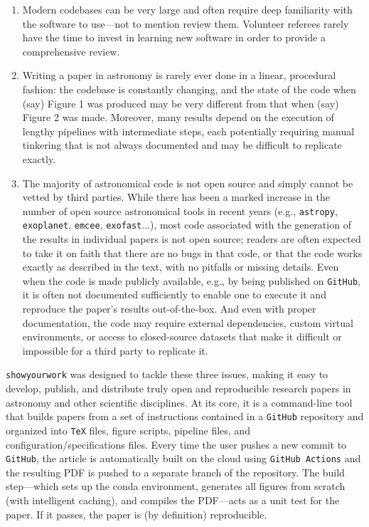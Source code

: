 \documentclass[modern]{aastex631}
\newcommand\syw{\texttt{showyourwork}\xspace}
\begin{document}
\begin{enumerate}
    \item Modern codebases can be very large and often require deep familiarity with the software to use---not to mention review them. Volunteer referees rarely have the time to invest in learning new software in order to provide a comprehensive review.
    \item  Writing a paper in astronomy is rarely ever done in a linear, procedural fashion: the codebase is constantly changing, and the state of the code when (say) Figure 1 was produced may be very different from that when (say) Figure 2 was made. 
    Moreover, many results depend on the execution of lengthy pipelines with intermediate steps, each potentially requiring manual tinkering that is not always documented and may be difficult to replicate exactly.
    \item The majority of astronomical code is not open source and simply cannot be vetted by third parties. 
    While there has been a marked increase in the number of open source astronomical tools in recent years (e.g., \texttt{astropy}, \texttt{exoplanet}, \texttt{emcee}, \texttt{exofast}...), most code associated with the generation of the results in individual papers is not open source; readers are often expected to take it on faith that there are no bugs in that code, or that the code works exactly as described in the text, with no pitfalls or missing details. 
    Even when the code is made publicly available, e.g., by being published on \texttt{GitHub}, it is often not documented sufficiently to enable one to execute it and reproduce the paper's results out-of-the-box. 
    And even with proper documentation, the code may require external dependencies, custom virtual environments, or access to closed-source datasets that make it difficult or impossible for a third party to replicate it.
\end{enumerate}

\syw was designed to tackle these three issues, making it easy to develop, publish, and distribute truly open and reproducible research papers in astronomy and other scientific disciplines. 
At its core, it is a command-line tool that builds papers from a set of instructions contained in a \texttt{GitHub} repository and organized into \texttt{TeX} files, figure scripts, pipeline files, and configuration/specifications files.
Every time the user pushes a new commit to \texttt{GitHub}, the article is automatically built on the cloud using \texttt{GitHub Actions} and the resulting PDF is pushed to a separate branch of the repository. 
The build step---which sets up the conda environment, generates all figures from scratch (with intelligent caching), and compiles the PDF---acts as a unit test for the paper. 
If it passes, the paper is (by definition) reproducible.
\end{document}
